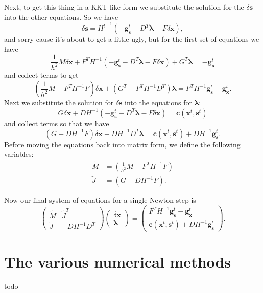 \documentclass[letterpaper,12pt]{article}
\theoremstyle{remark}
\newcommand{\x}{\mathbf{x}}
\newcommand{\C}{\mathbf{c}}
\newcommand{\s}{\mathbf{s}}
\newcommand{\la}{\mathbf{\lambda}}
\newcommand{\dx}{\delta \x}
\newcommand{\ds}{\delta \s}
\newcommand{\gx}{ {\mathbf{g}_\x^t} }
\newcommand{\gs}{ {\mathbf{g}_\s^t} }
\begin{document}
Next, to get this thing in a KKT-like form we substitute the solution for the $\ds$ into the other equations. So we have
\begin{equation}
\ds = {H^t}^{-1}\left(-\gs - D^T \la - F\dx \right),
\end{equation}
and sorry cause it's about to get a little ugly, but for the first set of equations we have
\begin{equation*}
\frac{1}{h^2}M\dx + F^TH^{-1}\left(-\gs - D^T\la - F\dx \right) +G^T \la = -\gx
\end{equation*}
and collect terms to get
\begin{equation}
\left(\frac{1}{h^2}M - F^TH^{-1}F \right)\dx + (G^T - F^TH^{-1}D^T)\la = 
F^TH^{-1}\gs -\gx.
\end{equation}
Next we substitute the solution for $\ds$ into the equations for $\la$:
\begin{equation*}
G\dx + DH^{-1}\left(-\gs - D^T\la - F\dx\right) = \C (\x^t, \s^t)
\end{equation*}
and collect terms so that we have
\begin{equation}
(G - DH^{-1}F)\dx - DH^{-1}D^T\la = \C (\x^t, \s^t) + DH^{-1}\gs.
\end{equation}
Before moving the equations back into matrix form, we define the following variables:
\begin{align}
\tilde{M} &= (\frac{1}{h^2}M - F^TH^{-1}F) \\
\tilde{J} &= (G - DH^{-1}F). 
\end{align}

Now our final system of equations for a single Newton step is
\begin{equation}
\begin{pmatrix}
\tilde{M} & \tilde{J}^T \\
\tilde{J} & -DH^{-1}D^T 
\end{pmatrix}
\begin{pmatrix}
\dx \\
\la
\end{pmatrix} =
\begin{pmatrix}
F^TH^{-1}\gs -\gx \\
\C (\x^t, \s^t) + DH^{-1}\gs
\end{pmatrix}.
\end{equation}

\section{The various numerical methods}
todo
\end{document}

